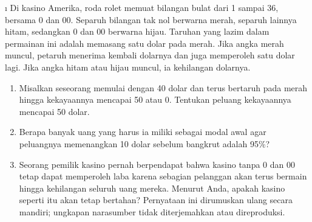 \begin{LJSItem}
\i\label{exer 12.2.12} Di kasino Amerika, roda rolet memuat bilangan bulat dari
1 sampai 36, bersama 0 dan 00. Separuh bilangan tak nol berwarna merah, separuh
lainnya hitam, sedangkan 0 dan 00 berwarna hijau. Taruhan yang lazim dalam
permainan ini adalah memasang satu dolar pada merah. Jika angka merah muncul,
petaruh menerima kembali dolarnya dan juga memperoleh satu dolar lagi. Jika
angka hitam atau hijau muncul, ia kehilangan dolarnya.
\begin{enumerate}
\item Misalkan seseorang memulai dengan 40 dolar dan terus bertaruh pada merah
hingga kekayaannya mencapai 50 atau 0. Tentukan peluang kekayaannya mencapai
50 dolar.
\item Berapa banyak uang yang harus ia miliki sebagai modal awal agar
peluangnya memenangkan 10 dolar sebelum bangkrut adalah 95\%?
\item Seorang pemilik kasino pernah berpendapat bahwa kasino tanpa 0 dan 00
tetap dapat memperoleh laba karena sebagian pelanggan akan terus bermain hingga
kehilangan seluruh uang mereka. Menurut Anda, apakah kasino seperti itu akan tetap
bertahan? Pernyataan ini dirumuskan ulang secara mandiri; ungkapan narasumber tidak
diterjemahkan atau direproduksi.
\end{enumerate}

\end{LJSItem}





 
